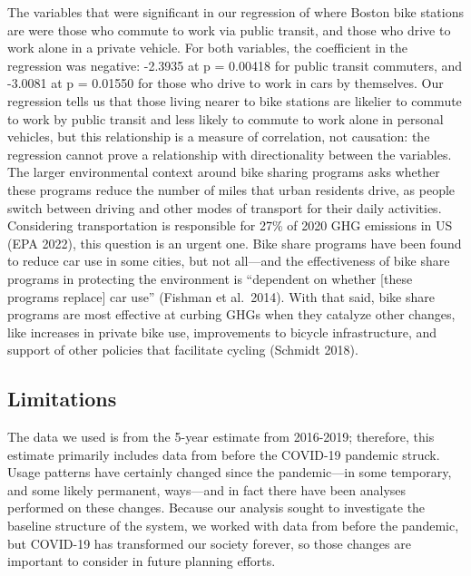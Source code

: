 \documentclass[
  12pt,
]{article}
\begin{document}
The variables that were significant in our regression of where Boston
bike stations are were those who commute to work via public transit, and
those who drive to work alone in a private vehicle. For both variables,
the coefficient in the regression was negative: -2.3935 at p = 0.00418
for public transit commuters, and -3.0081 at p = 0.01550 for those who
drive to work in cars by themselves. Our regression tells us that those
living nearer to bike stations are likelier to commute to work by public
transit and less likely to commute to work alone in personal vehicles,
but this relationship is a measure of correlation, not causation: the
regression cannot prove a relationship with directionality between the
variables. The larger environmental context around bike sharing programs
asks whether these programs reduce the number of miles that urban
residents drive, as people switch between driving and other modes of
transport for their daily activities. Considering transportation is
responsible for 27\% of 2020 GHG emissions in US (EPA 2022), this
question is an urgent one. Bike share programs have been found to reduce
car use in some cities, but not all---and the effectiveness of bike
share programs in protecting the environment is ``dependent on whether
{[}these programs replace{]} car use'' (Fishman et al.~2014). With that
said, bike share programs are most effective at curbing GHGs when they
catalyze other changes, like increases in private bike use, improvements
to bicycle infrastructure, and support of other policies that facilitate
cycling (Schmidt 2018).

\hypertarget{limitations}{%
\subsection{Limitations}\label{limitations}}

The data we used is from the 5-year estimate from 2016-2019; therefore,
this estimate primarily includes data from before the COVID-19 pandemic
struck. Usage patterns have certainly changed since the pandemic---in
some temporary, and some likely permanent, ways---and in fact there have
been analyses performed on these changes. Because our analysis sought to
investigate the baseline structure of the system, we worked with data
from before the pandemic, but COVID-19 has transformed our society
forever, so those changes are important to consider in future planning
efforts.
\end{document}
